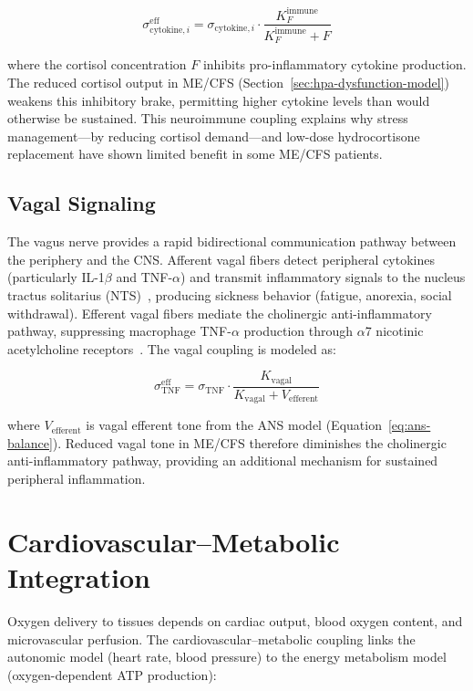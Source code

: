 \begin{equation}
\label{eq:cortisol-immune}
\sigma_{\text{cytokine},i}^{\text{eff}} = \sigma_{\text{cytokine},i} \cdot \frac{K_F^{\text{immune}}}{K_F^{\text{immune}} + F}
\end{equation}

where the cortisol concentration $F$ inhibits pro-inflammatory cytokine production. The reduced cortisol output in ME/CFS (Section~\ref{sec:hpa-dysfunction-model}) weakens this inhibitory brake, permitting higher cytokine levels than would otherwise be sustained. This neuroimmune coupling explains why stress management---by reducing cortisol demand---and low-dose hydrocortisone replacement have shown limited benefit in some ME/CFS patients.

\subsection{Vagal Signaling}

The vagus nerve provides a rapid bidirectional communication pathway between the periphery and the CNS. Afferent vagal fibers detect peripheral cytokines (particularly IL-1$\beta$ and TNF-$\alpha$) and transmit inflammatory signals to the nucleus tractus solitarius (NTS)~\cite{Marty2008NTS}, producing sickness behavior (fatigue, anorexia, social withdrawal). Efferent vagal fibers mediate the cholinergic anti-inflammatory pathway, suppressing macrophage TNF-$\alpha$ production through $\alpha$7 nicotinic acetylcholine receptors~\cite{Huerta2025vagal}. The vagal coupling is modeled as:

\begin{equation}
\label{eq:vagal-coupling}
\sigma_{\text{TNF}}^{\text{eff}} = \sigma_{\text{TNF}} \cdot \frac{K_{\text{vagal}}}{K_{\text{vagal}} + V_{\text{efferent}}}
\end{equation}

where $V_{\text{efferent}}$ is vagal efferent tone from the ANS model (Equation~\ref{eq:ans-balance}). Reduced vagal tone in ME/CFS therefore diminishes the cholinergic anti-inflammatory pathway, providing an additional mechanism for sustained peripheral inflammation.

\section{Cardiovascular--Metabolic Integration}
\label{sec:cardiovascular-metabolic}

Oxygen delivery to tissues depends on cardiac output, blood oxygen content, and microvascular perfusion. The cardiovascular--metabolic coupling links the autonomic model (heart rate, blood pressure) to the energy metabolism model (oxygen-dependent ATP production):

